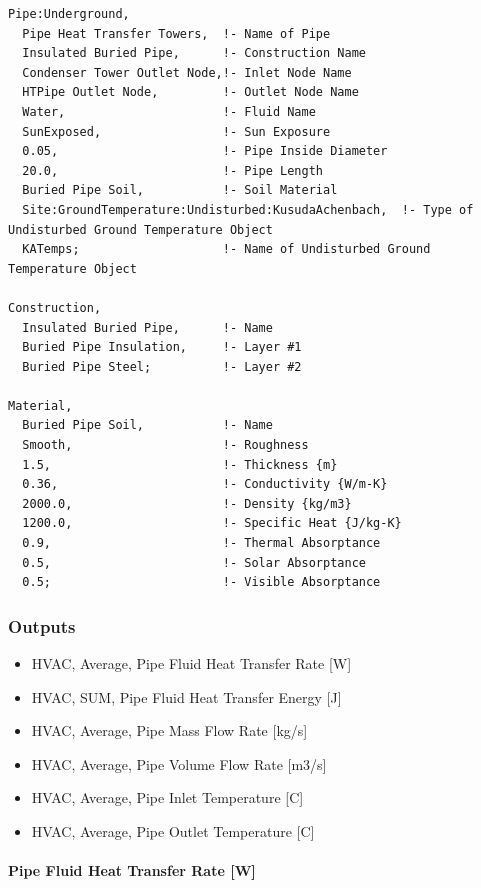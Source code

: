 \begin{lstlisting}
Pipe:Underground,
  Pipe Heat Transfer Towers,  !- Name of Pipe
  Insulated Buried Pipe,      !- Construction Name
  Condenser Tower Outlet Node,!- Inlet Node Name
  HTPipe Outlet Node,         !- Outlet Node Name
  Water,                      !- Fluid Name
  SunExposed,                 !- Sun Exposure
  0.05,                       !- Pipe Inside Diameter
  20.0,                       !- Pipe Length
  Buried Pipe Soil,           !- Soil Material
  Site:GroundTemperature:Undisturbed:KusudaAchenbach,  !- Type of Undisturbed Ground Temperature Object
  KATemps;                    !- Name of Undisturbed Ground Temperature Object

Construction,
  Insulated Buried Pipe,      !- Name
  Buried Pipe Insulation,     !- Layer #1
  Buried Pipe Steel;          !- Layer #2

Material,
  Buried Pipe Soil,           !- Name
  Smooth,                     !- Roughness
  1.5,                        !- Thickness {m}
  0.36,                       !- Conductivity {W/m-K}
  2000.0,                     !- Density {kg/m3}
  1200.0,                     !- Specific Heat {J/kg-K}
  0.9,                        !- Thermal Absorptance
  0.5,                        !- Solar Absorptance
  0.5;                        !- Visible Absorptance
\end{lstlisting}

\subsubsection{Outputs}\label{outputs-8-004}

\begin{itemize}
\item
  HVAC, Average, Pipe Fluid Heat Transfer Rate {[}W{]}
\item
  HVAC, SUM, Pipe Fluid Heat Transfer Energy {[}J{]}
\item
  HVAC, Average, Pipe Mass Flow Rate {[}kg/s{]}
\item
  HVAC, Average, Pipe Volume Flow Rate {[}m3/s{]}
\item
  HVAC, Average, Pipe Inlet Temperature {[}C{]}
\item
  HVAC, Average, Pipe Outlet Temperature {[}C{]}
\end{itemize}

\paragraph{Pipe Fluid Heat Transfer Rate {[}W{]}}\label{pipe-fluid-heat-transfer-rate-w-2}

